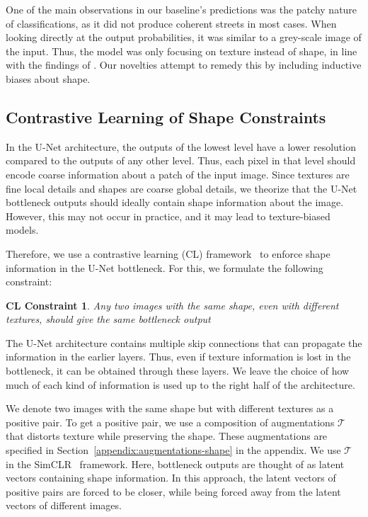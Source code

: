 One of the main observations in our baseline's predictions was the patchy nature of classifications, as it did not produce coherent streets in most cases. When looking directly at the output probabilities, it was similar to a grey-scale image of the input. Thus, the model was only focusing on texture instead of shape, in line with the findings of \cite{baker2018deep,texture-bias-1,texture-bias-2,texture-bias-3,texture-bias-4,texture-bias-5}. Our novelties attempt to remedy this by including inductive biases about shape.

\subsection{Contrastive Learning of Shape Constraints}
In the U-Net architecture, the outputs of the lowest level have a lower resolution compared to the outputs of any other level.
Thus, each pixel in that level should encode coarse information about a patch of the input image.
Since textures are fine local details and shapes are coarse global details, we theorize that the U-Net bottleneck outputs should ideally contain shape information about the image.
However, this may not occur in practice, and it may lead to texture-biased models.

Therefore, we use a contrastive learning (CL) framework~\cite{chopra2005learning} to enforce shape information in the U-Net bottleneck.
For this, we formulate the following constraint:

\newtheorem*{clconstraint}{CL Constraint}
\begin{clconstraint}
Any two images with the same shape, even with different textures, should give the same bottleneck output
\end{clconstraint}

The U-Net architecture contains multiple skip connections that can propagate the information in the earlier layers.
Thus, even if texture information is lost in the bottleneck, it can be obtained through these layers.
We leave the choice of how much of each kind of information is used up to the right half of the architecture.

We denote two images with the same shape but with different textures as a positive pair.
To get a positive pair, we use a composition of augmentations $\mathcal{T}$ that distorts texture while preserving the shape.
These augmentations are specified in Section~\ref{appendix:augmentations-shape} in the appendix.
We use $\mathcal{T}$ in the SimCLR~\cite{simclr} framework.
Here, bottleneck outputs are thought of as latent vectors containing shape information.
In this approach, the latent vectors of positive pairs are forced to be closer, while being forced away from the latent vectors of different images.


